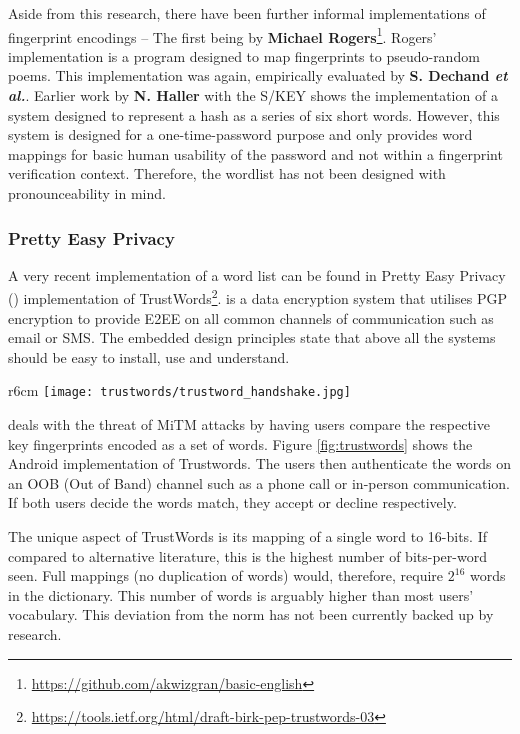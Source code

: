 Aside from this research, there have been further informal implementations of fingerprint encodings -- The first being by \textbf{Michael Rogers}\footnote{\url{https://github.com/akwizgran/basic-english}}. Rogers' implementation is a program designed to map fingerprints to pseudo-random poems. This implementation was again, empirically evaluated by \textbf{S. Dechand \textit{et al.}}\cite{dechand2016empirical}. Earlier work by \textbf{N. Haller} with the S/KEY\cite{haller1995s} shows the implementation of a system designed to represent a hash as a series of six short words. However, this system is designed for a one-time-password purpose and only provides word mappings for basic human usability of the password and not within a fingerprint verification context. Therefore, the wordlist has not been designed with pronounceability in mind.

\newpage

\subsubsection*{Pretty Easy Privacy}
\label{sec:pep}
A very recent implementation of a word list can be found in Pretty Easy Privacy (\pep) implementation of TrustWords\footnote{\url{https://tools.ietf.org/html/draft-birk-pep-trustwords-03}}. \pep is a data encryption system that utilises PGP encryption to provide E2EE on all common channels of communication such as email or SMS. The embedded design principles state that above all the systems should be easy to install, use and understand.

\begin{wrapfigure}{r}{6cm}
    \centering
    \texttt{[image: trustwords/trustword\_handshake.jpg]}
    \caption{Trustword fingerprint verification}
    \label{fig:trustwords}
\end{wrapfigure}

\pep deals with the threat of MiTM attacks by having users compare the respective key fingerprints encoded as a set of words. Figure \ref{fig:trustwords} shows the \pep Android implementation of Trustwords. The users then authenticate the words on an OOB (Out of Band) channel such as a phone call or in-person communication. If both users decide the words match, they accept or decline respectively.

The unique aspect of TrustWords is its mapping of a single word to 16-bits. If compared to alternative literature, this is the highest number of bits-per-word seen. Full mappings (no duplication of words) would, therefore, require $2^{16}$ words in the dictionary. This number of words is arguably higher than most users' vocabulary. This deviation from the norm has not been currently backed up by research. 

